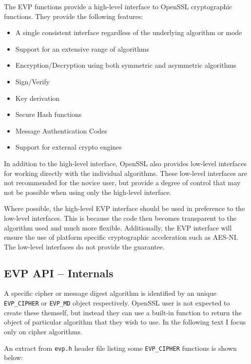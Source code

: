 The EVP functions provide a high-level interface to OpenSSL cryptographic functions. They provide the following features:

\begin{itemize}
  \item A single consistent interface regardless of the underlying algorithm or mode
  \item Support for an extensive range of algorithms
  \item Encryption/Decryption using both symmetric and asymmetric algorithms
  \item Sign/Verify
  \item Key derivation
  \item Secure Hash functions
  \item Message Authentication Codes
  \item Support for external crypto engines
\end{itemize}

In addition to the high-level interface, OpenSSL also provides low-level interfaces for working directly with the individual algorithms. These low-level interfaces are not recommended for the novice user, but provide a degree of control that may not be possible when using only the high-level interface.

Where possible, the high-level EVP interface should be used in preference to the low-level interfaces. This is because the code then becomes transparent to the algorithm used and much more flexible. Additionally, the EVP interface will ensure the use of platform specific cryptographic acceleration such as AES-NI. The low-level interfaces do not provide the guarantee.


\subsection{EVP API -- Internals}

A specific cipher or message digest algorithm is identified by an unique \texttt{EVP\_CIPHER} or \texttt{EVP\_MD} object respectively. OpenSSL user is not expected to create these themself, but instead they can use a built-in function to return the object of particular algorithm that they wish to use. In the following text I focus only on cipher algorithms.

An extract from \texttt{evp.h} header file listing some \texttt{EVP\_CIPHER} functions is shown below:

\inputminted{c}{code/openssl-evp-ciphers.c}

